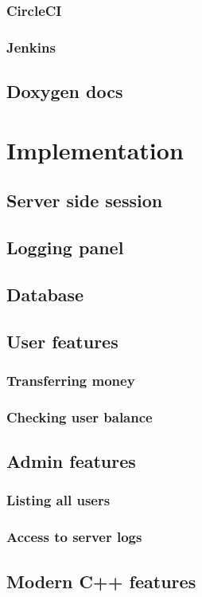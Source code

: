\documentclass[a4paper,12pt]{article}
\begin{document}
\subsubsection{CircleCI}
\subsubsection{Jenkins}
\subsection{Doxygen docs}

\section{Implementation}
\subsection{Server side session}
\subsection{Logging panel}
\subsection{Database}
\subsection{User features}
\subsubsection{Transferring money}
\subsubsection{Checking user balance}
\subsection{Admin features}
\subsubsection{Listing all users}
\subsubsection{Access to server logs}
\subsection{Modern C++ features}
\end{document}
